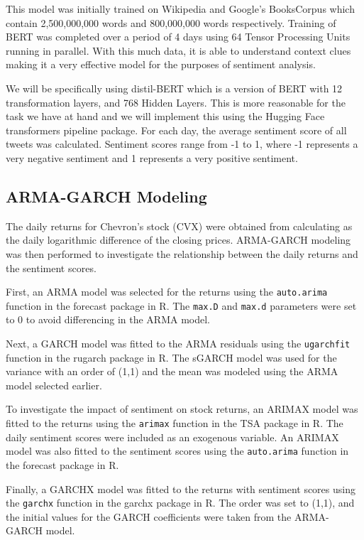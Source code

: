 \documentclass[12pt, letterpaper, titlepage]{article}
\begin{document}
This model was initially trained on Wikipedia and Google’s BooksCorpus which contain 2,500,000,000 words and 800,000,000 words respectively. Training of BERT was completed over a period of 4 days using 64 Tensor Processing Units running in parallel. With this much data, it is able to understand context clues making it a very effective model for the purposes of sentiment analysis.


We will be specifically using distil-BERT which is a version of BERT with 12 transformation layers, and 768 Hidden Layers.\citep{muller_2022} This is more reasonable for the task we have at hand and we will implement this using the Hugging Face transformers pipeline package\citep{huggingface2023}. For each day, the average sentiment score of all tweets was calculated. Sentiment scores range from -1 to 1, where -1 represents a very negative sentiment and 1 represents a very positive sentiment.

\subsection{ARMA-GARCH Modeling}
The daily returns for Chevron's stock (CVX) were obtained from calculating as the daily logarithmic difference of the closing prices. ARMA-GARCH modeling was then performed to investigate the relationship between the daily returns and the sentiment scores.

First, an ARMA model was selected for the returns using the \texttt{auto.arima} function in the forecast package in R. The \texttt{max.D} and \texttt{max.d} parameters were set to 0 to avoid differencing in the ARMA model.

Next, a GARCH model was fitted to the ARMA residuals using the \texttt{ugarchfit} function in the rugarch package in R. The sGARCH model was used for the variance with an order of (1,1) and the mean was modeled using the ARMA model selected earlier.

To investigate the impact of sentiment on stock returns, an ARIMAX model was fitted to the returns using the \texttt{arimax} function in the TSA package in R. The daily sentiment scores were included as an exogenous variable. An ARIMAX model was also fitted to the sentiment scores using the \texttt{auto.arima} function in the forecast package in R.

Finally, a GARCHX model was fitted to the returns with sentiment scores using the \texttt{garchx} function in the garchx package in R. The order was set to (1,1), and the initial values for the GARCH coefficients were taken from the ARMA-GARCH model.
\end{document}
